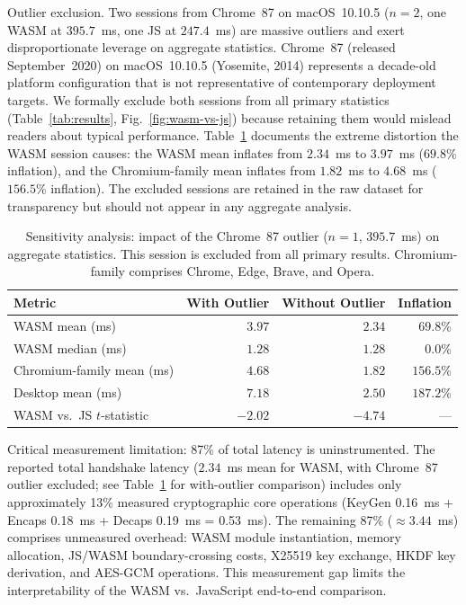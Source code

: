 \documentclass[11pt,a4paper]{article}
\def\textbf#1{#1}%
\begin{document}
\textbf{Outlier exclusion.} Two sessions from Chrome~87 on macOS~10.10.5 ($n=2$, one WASM at $395.7$~ms, one JS at $247.4$~ms) are massive outliers and exert disproportionate leverage on aggregate statistics. Chrome~87 (released September~2020) on macOS~10.10.5 (Yosemite, 2014) represents a decade-old platform configuration that is not representative of contemporary deployment targets. \textbf{We formally exclude both sessions from all primary statistics} (Table~\ref{tab:results}, Fig.~\ref{fig:wasm-vs-js}) because retaining them would mislead readers about typical performance. Table~\ref{tab:outlier} documents the extreme distortion the WASM session causes: the WASM mean inflates from $2.34$~ms to $3.97$~ms ($69.8$\% inflation), and the Chromium-family mean inflates from $1.82$~ms to $4.68$~ms ($156.5$\% inflation). The excluded sessions are retained in the raw dataset for transparency but should not appear in any aggregate analysis.

\begin{table}[htbp]
\centering
\caption{Sensitivity analysis: impact of the Chrome~87 outlier ($n=1$, $395.7$~ms) on aggregate statistics. \textbf{This session is excluded from all primary results.} Chromium-family comprises Chrome, Edge, Brave, and Opera.}
\label{tab:outlier}
\begin{tabular}{@{}lrrr@{}}
\toprule
\textbf{Metric} & \textbf{With Outlier} & \textbf{Without Outlier} & \textbf{Inflation} \\
\midrule
WASM mean (ms) & $3.97$ & $2.34$ & $69.8$\% \\
WASM median (ms) & $1.28$ & $1.28$ & $0.0$\% \\
Chromium-family mean (ms) & $4.68$ & $1.82$ & $156.5$\% \\
Desktop mean (ms) & $7.18$ & $2.50$ & $187.2$\% \\
WASM vs.\ JS $t$-statistic & $-2.02$ & $-4.74$ & --- \\
\bottomrule
\end{tabular}
\end{table}

\textbf{Critical measurement limitation: 87\% of total latency is uninstrumented.} The reported total handshake latency ($2.34$~ms mean for WASM, with Chrome~87 outlier excluded; see Table~\ref{tab:outlier} for with-outlier comparison) includes only approximately 13\% measured cryptographic core operations (KeyGen 0.16~ms + Encaps 0.18~ms + Decaps 0.19~ms = 0.53~ms). The remaining 87\% ($\approx 3.44$~ms) comprises unmeasured overhead: WASM module instantiation, memory allocation, JS/WASM boundary-crossing costs, X25519 key exchange, HKDF key derivation, and AES-GCM operations. This measurement gap limits the interpretability of the WASM vs.\ JavaScript end-to-end comparison.
\end{document}
